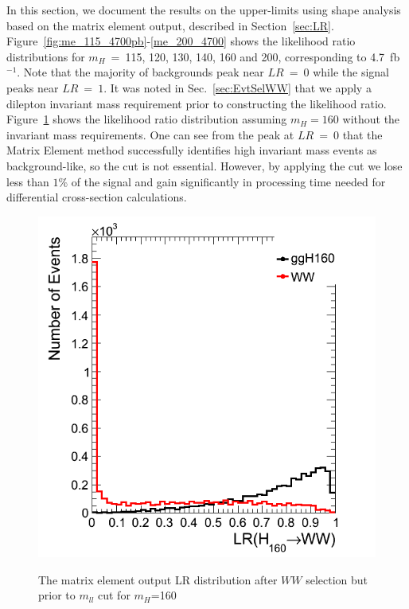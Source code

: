 In this section, we document the results on the upper-limits using shape analysis based on 
the matrix element output, described in Section~\ref{sec:LR}. 
Figure~\ref{fig:me_115_4700pb}-\ref{me_200_4700} shows the likelihood ratio distributions for $m_H$~=~115, 120, 130, 140, 160 and 200\GeVcc,               
corresponding to 4.7~fb$^{-1}$. 
Note that the majority of backgrounds peak near $LR~=~0$ while the signal peaks near $LR~=~1$.  
It was noted in Sec.~\ref{sec:EvtSelWW} that we apply a dilepton invariant mass requirement prior to constructing the likelihood ratio. 
Figure~\ref{fig:LR_noMll} shows the likelihood ratio distribution assuming $m_{H}=160$ \GeVcc without the invariant mass requirements.
One can see from the peak at $LR~=~0$ that the Matrix Element method successfully identifies high invariant mass events as background-like, so the cut is not essential. However, by applying the cut we lose less than $1\%$ of the signal and gain significantly in processing time needed for differential cross-section calculations.

\begin{figure}[!hbtp]                                                                                         
\centering                                                                                                                                             
\includegraphics[width=.5\textwidth]{figures/LR_noMll.png}\\                                            
\caption{The matrix element output LR distribution after $WW$ selection but prior to $m_{ll}$ cut                      
for $m_H$=160 \GeVcc}
\label{fig:LR_noMll}                                                                                          
\end{figure}




